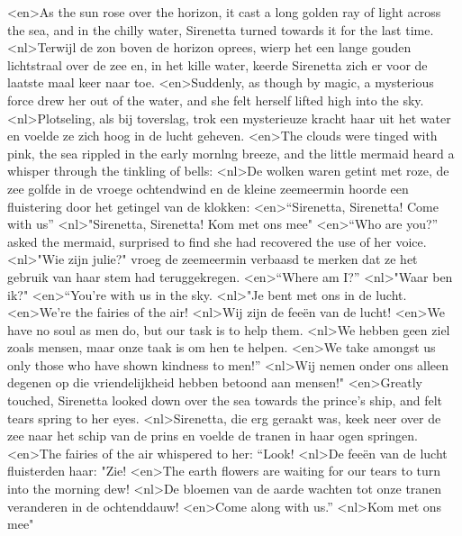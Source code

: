<en>As the sun rose over the horizon, it cast a long golden ray of light across the sea, and in the chilly water, Sirenetta turned towards it for the last time.
<nl>Terwijl de zon boven de horizon oprees, wierp het een lange gouden lichtstraal over de zee en, in het kille water, keerde Sirenetta zich er voor de laatste maal keer naar toe.
<en>Suddenly, as though by magic, a mysterious force drew her out of the water, and she felt herself lifted high into the sky.
<nl>Plotseling, als bij toverslag, trok een mysterieuze kracht haar uit het water en voelde ze zich hoog in de lucht geheven.
<en>The clouds were tinged with pink, the sea rippled in the early mornlng breeze, and the little mermaid heard a whisper through the tinkling of bells: 
<nl>De wolken waren getint met roze, de zee golfde in de vroege ochtendwind en de kleine zeemeermin hoorde een fluistering door het getingel van de klokken: 
<en>“Sirenetta, Sirenetta! Come with us”
<nl>"Sirenetta, Sirenetta! Kom met ons mee"
<en>“Who are you?” asked the mermaid, surprised to find she had recovered the use of her voice.
<nl>"Wie zijn julie?" vroeg de zeemeermin verbaasd te merken dat ze het gebruik van haar stem had teruggekregen.
<en>“Where am I?”
<nl>"Waar ben ik?"
<en>“You’re with us in the sky.
<nl>"Je bent met ons in de lucht.
<en>We’re the fairies of the air!
<nl>Wij zijn de feeën van de lucht!
<en>We have no soul as men do, but our task is to help them.
<nl>We hebben geen ziel zoals mensen, maar onze taak is om hen te helpen.
<en>We take amongst us only those who have shown kindness to men!”
<nl>Wij nemen onder ons alleen degenen op die vriendelijkheid hebben betoond aan mensen!"
<en>Greatly touched, Sirenetta looked down over the sea towards the prince’s ship, and felt tears spring to her eyes.
<nl>Sirenetta, die erg geraakt was, keek neer over de zee naar het schip van de prins en voelde de tranen in haar ogen springen.
<en>The fairies of the air whispered to her: “Look!
<nl>De feeën van de lucht fluisterden haar: "Zie!
<en>The earth flowers are waiting for our tears to turn into the morning dew!
<nl>De bloemen van de aarde wachten tot onze tranen veranderen in de ochtenddauw!
<en>Come along with us.”
<nl>Kom met ons mee"
